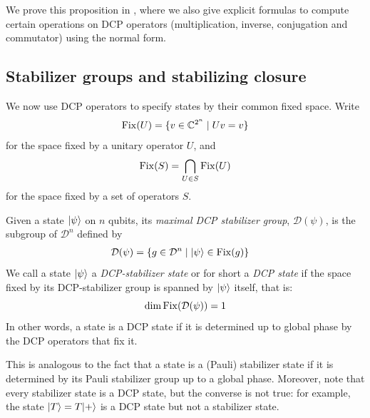 \begin{proposition}\label{prop:dcp-normal-form}
\dcpNormalFormStatement
\end{proposition}
We prove this proposition in , where we also give explicit formulas to compute certain operations on DCP operators (multiplication, inverse, conjugation and commutator) using the normal form.

\subsection{Stabilizer groups and stabilizing closure}

We now use DCP operators to specify states by their common fixed space. Write
\begin{align}
    \operatorname{Fix}(U) = \{ v \in \mathbb{C}^{2^n} \mid Uv = v \}
\end{align}
for the space fixed by a unitary operator $U$, and
\begin{align}
    \operatorname{Fix}(S)=\bigcap_{U \in S} \operatorname{Fix}(U)
\end{align}
for the space fixed by a set of operators $S$.

\begin{definition}\label{def:dcp-state}
    Given a state $|\psi\rangle$ on $n$ qubits, its \textit{maximal DCP stabilizer group}, $\mathcal{D}(\psi)$, is the subgroup of $\mathcal{D}^n$ defined by
    \begin{align}
        \mathcal{D}(\psi) &= \{ g \in \mathcal{D}^n \mid |\psi\rangle \in \operatorname{Fix}(g) \}
    \end{align}
    We call a state $|\psi\rangle$ a \textit{DCP-stabilizer state} or for short a \textit{DCP state} if the space fixed by its DCP-stabilizer group is spanned by $|\psi\rangle$ itself, that is:
    \[
    \dim \operatorname{Fix}(\mathcal{D}(\psi)) = 1
    \]
    In other words, a state is a DCP state if it is determined up to global phase by the DCP operators that fix it.
\end{definition}

\begin{remark}
    This is analogous to the fact that a state is a (Pauli) stabilizer state if it is determined by its Pauli stabilizer group up to a global phase. Moreover, note that every stabilizer state is a DCP state, but the converse is not true: for example, the state $|T\rangle=T|+\rangle$ is a DCP state but not a stabilizer state.
\end{remark}

